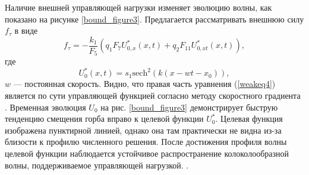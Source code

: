 Наличие внешней управляющей нагрузки изменяет эволюцию волны, как показано на рисунке \ref{bound_figure3}. Предлагается рассматривать внешнюю силу $f_\tau$ в виде
\[
f_\tau=-\frac{k_1}{F_5}\left(q_1 F_7 U^*_{0,x}(x,t)+  q_2 F_{11} U_{0,xt}^*(x,t)\right),
\]
где
\[
U^*_0(x,t)=s_1 {\text{sech}}^2 (k (x-w t-x_0)),
\]
$w$ --- постоянная скорость. Видно, что правая часть уравнения (\ref{weakeq4}) является по сути управляющей функцией согласно методу скоростного градиента \cite{bound_horizont, porant16, porant17}. Временная эволюция  $U_0$ на рис. \ref{bound_figure3} демонстрирует быструю тенденцию смещения горба вправо к целевой функции $U_0^*$. Целевая функция изображена пунктирной линией, однако она там практически не видна из-за близости к профилю численного решения. После достижения профиля волны целевой функции наблюдается устойчивое распространение колоколообразной волны, поддерживаемое управляющей нагрузкой. .


